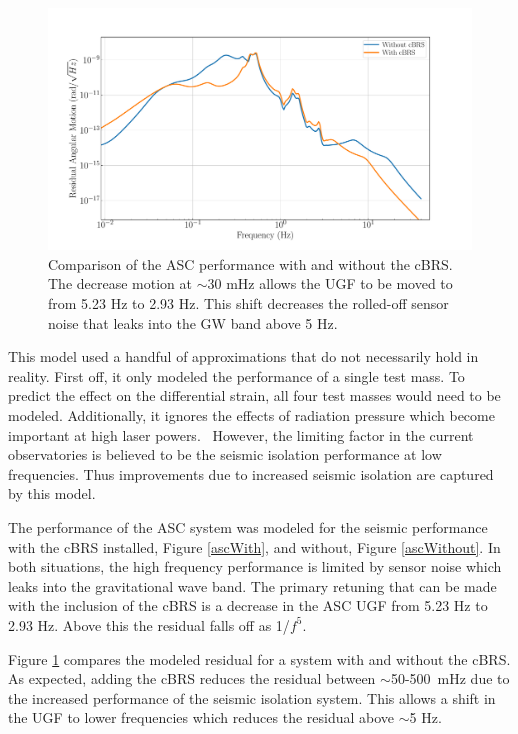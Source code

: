 \documentclass [12pt, proquest]{uwthesis}[2019]
\begin{document}
\begin{figure}[!h]
\begin{center}
\includegraphics[width=\textwidth]{cBRS_ASC_LowF.pdf}
\caption[Comparison of the ASC performance with and without the cBRS]{Comparison of the ASC performance with and without the cBRS. The decrease motion at $\sim$30 mHz allows the UGF to be moved to from 5.23 Hz to 2.93 Hz. This shift decreases the rolled-off sensor noise that leaks into the GW band above 5 Hz.}
\label{ascComp}
\end{center}
\end{figure}

This model used a handful of approximations that do not necessarily hold in reality. First off, it only modeled the performance of a single test mass. To predict the effect on the differential strain, all four test masses would need to be modeled. Additionally, it ignores the effects of radiation pressure which become important at high laser powers.~\cite{ASC} However, the limiting factor in the current observatories is believed to be the seismic isolation performance at low frequencies. Thus improvements due to increased seismic isolation are captured by this model.

The performance of the ASC system was modeled for the seismic performance with the cBRS installed, Figure \ref{ascWith}, and without, Figure \ref{ascWithout}. In both situations, the high frequency performance is limited by sensor noise which leaks into the gravitational wave band. The primary retuning that can be made with the inclusion of the cBRS is a decrease in the ASC UGF from 5.23 Hz to 2.93 Hz. Above this the residual falls off as 1/$f^5$.


Figure \ref{ascComp} compares the modeled residual for a system with and without the cBRS. As expected, adding the cBRS reduces the residual between $\sim$50-500~mHz due to the increased performance of the seismic isolation system. This allows a shift in the UGF to lower frequencies which reduces the residual above $\sim$5 Hz. 
\end{document}
